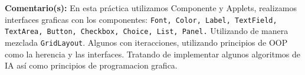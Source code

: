 \noindent\textbf{Comentario(s):} 
En esta práctica utilizamos Componente y Applets, realizamos interfaces graficas con los componentes: \texttt{Font, Color, Label, TextField, TextArea, Button, Checkbox, Choice, List, Panel.} Utilizando de manera mezclada \texttt{GridLayout}. Algunos con iteracciones, utilizando principios de OOP como la herencia y las interfaces. Tratando de implementar algunos algoritmos de IA así como principios de programacion grafica.